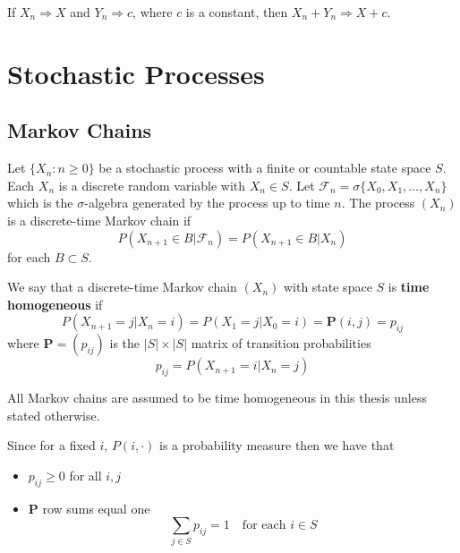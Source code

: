 
\begin{theorem} \label{thm:conv_together_lemma}
If $X_n \Rightarrow X$ and $Y_n \Rightarrow c$, where $c$ is a constant, then $X_n + Y_n \Rightarrow X + c$.
\end{theorem}

\section{Stochastic Processes}

\subsection{Markov Chains}

\begin{defn} \cite{schapira2017}
Let $\{X_n : n \geq 0\}$ be a stochastic process with a finite or countable state space $S$.
Each $X_n$ is a discrete random variable with $X_n \in S$.
Let $\mathscr{F}_n = \sigma\{X_0, X_1, \ldots, X_n\}$ which is the $\sigma$-algebra generated by the process up to time $n$.
The process $(X_n)$ is a discrete-time Markov chain if
$$
P(X_{n + 1} \in B | \mathscr{F}_n) = P(X_{n + 1} \in B | X_n)
$$
for each $B \subset S$.
\end{defn}

\begin{defn}\cite{grimmett2001}
We say that a discrete-time Markov chain $(X_n)$ with state space $S$ is \textbf{time homogeneous} if
$$
P(X_{n + 1} = j | X_n = i) = P(X_{1} = j | X_0 = i) = \mathbf{P}(i,j) = p_{ij}
$$
where $\mathbf{P} = (p_{ij})$ is the $|S| \times |S|$ matrix of transition probabilities
$$
p_{ij} = P(X_{n + 1} = i | X_n = j)
$$

All Markov chains are assumed to be time homogeneous in this thesis unless stated otherwise.
\end{defn}

\begin{remark}
Since for a fixed $i$, $P(i, \cdot)$ is a probability measure then we have that
\begin{itemize}
    \item $p_{ij} \geq 0$ for all $i,j$
    \item $\mathbf{P}$ row sums equal one
    $$
    \sum_{j \in S} p_{ij} = 1 \quad \text{for each } i \in S
    $$
\end{itemize}
\end{remark}

